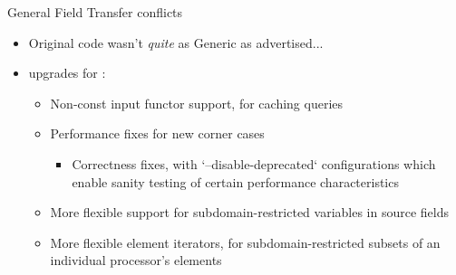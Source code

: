 %
%


\begin{frame}{General Field Transfer conflicts}

\begin{itemize}
  \item Original  code wasn't \emph{quite} as Generic as advertised...
\end{itemize}

\begin{itemize}
  \item {} upgrades for :
  \begin{itemize}
    \item Non-const input functor support, for caching queries
    \item Performance fixes for new corner cases
    \begin{itemize}
      \item Correctness fixes, with `--disable-deprecated`
        configurations which enable sanity testing of certain
        performance characteristics
    \end{itemize}
    \item More flexible support for subdomain-restricted
      variables in source fields
    \item More flexible element iterators, for subdomain-restricted
      subsets of an individual processor's elements
  \end{itemize}
\end{itemize}

\end{frame}


